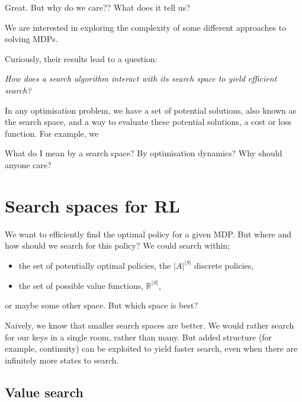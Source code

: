 
Great. But why do we care?? What does it tell us?

We are interested in exploring the complexity of some different approaches to solving MDPs.

Curiously, their results lead to a question:

\begin{displayquote}
  \textit{How does a search algorithm interact with its search space to yield efficient search?}
\end{displayquote}

In any optimisation problem, we have a set of potential solutions, also known as the search space,
and a way to evaluate these potential solutions, a cost or loss function. For example, we

What do I mean by a search space? By optimisation dynamics? Why should anyone care?


\section{Search spaces for RL}

We want to efficiently find the optimal policy for a given MDP. But where and how should we
search for this policy? We could search within;

\begin{itemize}
\tightlist
\item
the set of potentially optimal policies, the \(|A|^{|S|}\) discrete policies,
\item
the set of possible value functions, \(\mathbb R^{|S|}\),
\end{itemize}
or maybe some other space. But which space is best?

Naively, we know that smaller search spaces are better. We would rather
search for our keys in a single room, rather than many. But added
structure (for example, continuity) can be exploited to yield faster
search, even when there are infinitely more states to search.


\subsection{Value search}

